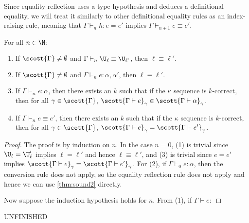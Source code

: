 Since equality reflection uses a type hypothesis and deduces a definitional equality, we will treat it similarly to other definitional equality rules as an index-raising rule, meaning that $\Gamma\vdash_n h:e=e'$ implies $\Gamma\vdash_{n+1} e\equiv e'$.

\begin{theorem}
For all $n\in\N$:
\begin{enumerate}
\item If $\scott{\Gamma}\ne\emptyset$ and $\Gamma\vdash_n\U_\ell\equiv\U_{\ell'}$, then $\ell\equiv\ell'$.
\item If $\scott{\Gamma}\ne\emptyset$ and $\Gamma\vdash_n e:\alpha,\alpha'$, then $\ell\equiv\ell'$.
\item If $\Gamma\vdash_n e:\alpha$, then there exists an $k$ such that if the $\kappa$ sequence is $k$-correct, then for all $\gamma\in\scott{\Gamma}$, $\scott{\Gamma\vdash e}_\gamma\in \scott{\Gamma\vdash \alpha}_\gamma$.
\item If $\Gamma\vdash_n e\equiv e'$, then there exists an $k$ such that if the $\kappa$ sequence is $k$-correct, then for all $\gamma\in\scott{\Gamma}$, $\scott{\Gamma\vdash e}_\gamma=\scott{\Gamma\vdash e'}_\gamma$.
\end{enumerate}
\end{theorem}
\begin{proof}
The proof is by induction on $n$. In the case $n=0$, (1) is trivial since $\U_\ell=\U_\ell'$ implies $\ell=\ell'$ and hence $\ell\equiv\ell'$, and (3) is trivial since $e=e'$ implies $\scott{\Gamma\vdash e}_{\gamma}=\scott{\Gamma\vdash e'}_{\gamma}$. For (2), if $\Gamma\vdash_0 e:\alpha$, then the conversion rule does not apply, so the equality reflection rule does not apply and hence we can use \autoref{thm:sound2} directly.

Now suppose the induction hypothesis holds for $n$. From (1), if $\Gamma\vdash e:$
\end{proof}

UNFINISHED
